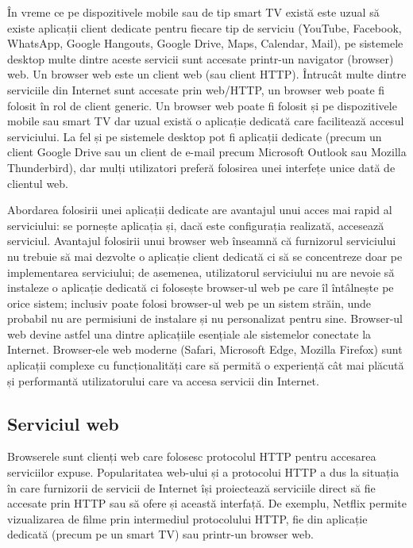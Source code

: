 În vreme ce pe dispozitivele mobile sau de tip smart TV există este uzual să existe aplicații client dedicate pentru fiecare tip de serviciu (YouTube, Facebook, WhatsApp, Google Hangouts, Google Drive, Maps, Calendar, Mail), pe sistemele desktop multe dintre aceste servicii sunt accesate printr-un navigator (browser) web. Un browser web este un client web (sau client HTTP). Întrucât multe dintre serviciile din Internet sunt accesate prin web/HTTP, un browser web poate fi folosit în rol de client generic. Un browser web poate fi folosit și pe dispozitivele mobile sau smart TV dar uzual există o aplicație dedicată care facilitează accesul serviciului. La fel și pe sistemele desktop pot fi aplicații dedicate (precum un client Google Drive sau un client de e-mail precum Microsoft Outlook sau Mozilla Thunderbird), dar mulți utilizatori preferă folosirea unei interfețe unice dată de clientul web.

Abordarea folosirii unei aplicații dedicate are avantajul unui acces mai rapid al serviciului: se pornește aplicația și, dacă este configurația realizată, accesează serviciul. Avantajul folosirii unui browser web înseamnă că furnizorul serviciului nu trebuie să mai dezvolte o aplicație client dedicată ci să se concentreze doar pe implementarea serviciului; de asemenea, utilizatorul serviciului nu are nevoie să instaleze o aplicație dedicată ci folosește browser-ul web pe care îl întâlnește pe orice sistem; inclusiv poate folosi browser-ul web pe un sistem străin, unde probabil nu are permisiuni de instalare și nu personalizat pentru sine. Browser-ul web devine astfel una dintre aplicațiile esențiale ale sistemelor conectate la Internet. Browser-ele web moderne (Safari, Microsoft Edge, Mozilla Firefox) sunt aplicații complexe cu funcționalități care să permită o experiență cât mai plăcută și performantă utilizatorului care va accesa servicii din Internet.

\subsection{Serviciul web}
\label{sec:net:web}

Browserele sunt clienți web care folosesc protocolul HTTP pentru accesarea serviciilor expuse. Popularitatea web-ului și a protocolui HTTP a dus la situația în care furnizorii de servicii de Internet își proiectează serviciile direct să fie accesate prin HTTP sau să ofere și această interfață. De exemplu, Netflix permite vizualizarea de filme prin intermediul protocolului HTTP, fie din aplicație dedicată (precum pe un smart TV) sau printr-un browser web.

